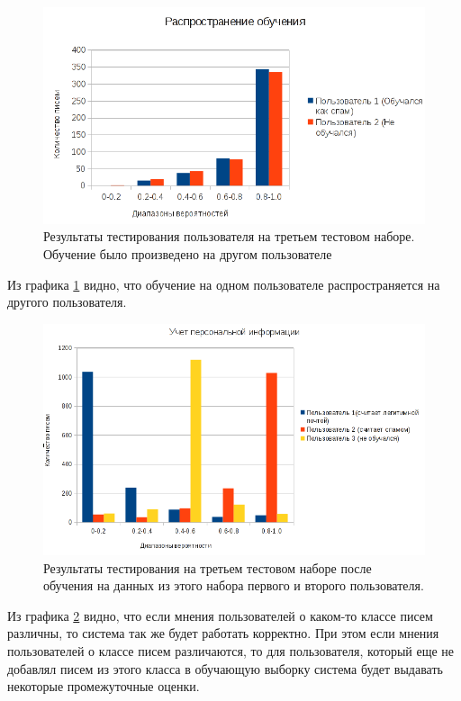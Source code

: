 \begin{figure}[h]
\begin{center}
\includegraphics[width=15cm]{img/experiment2}
\end{center}
\caption{Результаты тестирования пользователя на третьем тестовом наборе. Обучение было произведено на другом пользователе \cite{SAPC}}
\label{EXPERIMENT2}
\end{figure}

Из графика \ref{EXPERIMENT2} видно, что обучение на одном пользователе распространяется на другого пользователя.


\begin{figure}[h]
\begin{center}
\includegraphics[width=15cm]{img/experiment3}
\end{center}
\caption{Результаты тестирования на третьем тестовом наборе после обучения на данных из этого набора первого и второго пользователя.}
\label{EXPERIMENT3}
\end{figure}

Из графика \ref{EXPERIMENT3} видно, что если мнения пользователей о каком-то классе писем различны, то система так же будет работать корректно. При этом если мнения пользователей о классе писем различаются, то для пользователя, который еще не добавлял писем из этого класса в обучающую выборку система будет выдавать некоторые промежуточные оценки.




